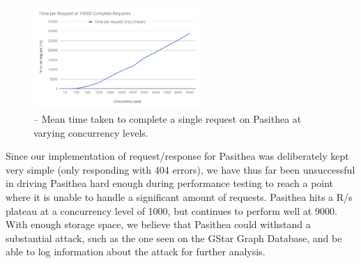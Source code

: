 \begin{figure}[ht]
\centering
\includegraphics[width=2.5in]{images/TimeperRequest.png} 
\caption{-- Mean time taken to complete a single request on Pasithea at varying concurrency levels.}
\label{fig:T/R}
\end{figure}

Since our implementation of request/response for Pasithea was deliberately kept very simple (only responding with 404 errors), we have thus far been unsuccessful in driving Pasithea hard enough during performance testing to reach a point where it is unable to handle a significant amount of requests.  Pasithea hits a R/s plateau at a concurrency level of 1000, but continues to perform well at 9000. With enough storage space, we believe that Pasithea could withstand a substantial attack, such as the one seen on the GStar Graph Database, and be able to log information about the attack for further analysis.
